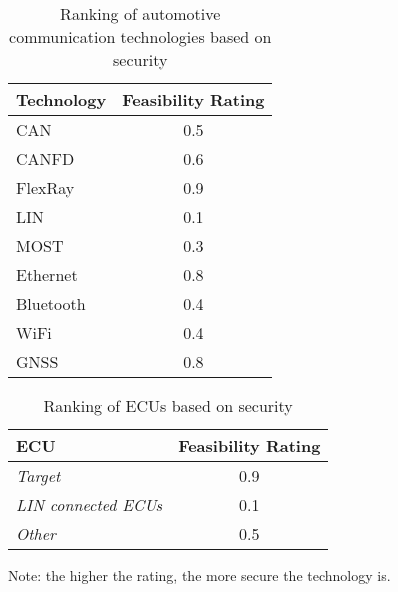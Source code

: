 \begin{table}[h]
    \label{table:bus_rating}
    \centering
    \begin{tabular}{|l|c|}
    \hline
    \textbf{Technology} & \textbf{Feasibility Rating} \\
    \hline
    CAN & 0.5 \\
    CANFD & 0.6 \\
    FlexRay & 0.9 \\
    LIN & 0.1 \\
    MOST & 0.3 \\
    Ethernet & 0.8 \\
    Bluetooth & 0.4 \\
    WiFi & 0.4 \\
    GNSS & 0.8 \\
    \hline
    \end{tabular}
    \caption{Ranking of automotive communication technologies based on security}
\end{table}

\begin{table}[h]
    \label{table:ecu_rating}
    \centering
    \begin{tabular}{|l|c|}
    \hline
    \textbf{ECU} & \textbf{Feasibility Rating} \\
    \hline
    \textit{Target} & 0.9 \\
    \textit{LIN connected ECUs} & 0.1 \\
    \textit{Other} & 0.5 \\
    \hline
    \end{tabular}
    \caption{Ranking of ECUs based on security}
\end{table}

Note: the higher the rating, the more secure the technology is.